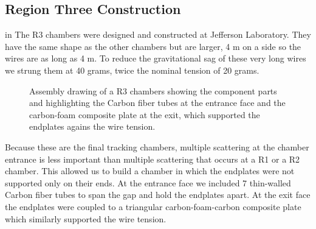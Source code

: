 
\subsection{Region Three Construction}

 in
The R3 chambers were designed and constructed at Jefferson Laboratory.  
They have the same shape as the other chambers but are larger,
4 m on a side so the wires are as long as 4 m.
To reduce the gravitational sag of these very long wires we
strung them at 40 grams, twice the nominal tension of 20 grams.

\begin{figure}[htpb]
\vspace{7.9cm}
\caption{\small{Assembly drawing of a R3 chambers showing the component
parts and highlighting the Carbon fiber tubes at the entrance face and
the carbon-foam composite plate at the exit, which supported the endplates
agains the wire tension.}}
\label{r3_cut}
\end{figure}

Because these are the final tracking chambers, multiple scattering
at the chamber entrance is less important than multiple scattering that
occurs at a R1 or a R2 chamber.  This allowed us to 
build a chamber in which the endplates were not supported only on
their ends.  At the entrance face we included 7 thin-walled Carbon
fiber tubes to span the gap and hold the endplates apart.  At the
exit face the endplates were coupled to a triangular carbon-foam-carbon
composite plate which similarly supported the wire tension.




